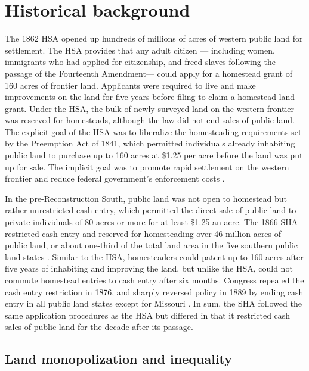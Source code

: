 \documentclass[12pt]{article}
\begin{document}
\setcounter{section}{1} %
\section{Historical background} \label{history}

The 1862 HSA opened up hundreds of millions of acres of western public land for settlement. The HSA provides that any adult citizen --- including women, immigrants who had applied for citizenship, and freed slaves following the passage of the Fourteenth Amendment---  could apply for a homestead grant of 160 acres of frontier land. Applicants were required to live and make improvements on the land for five years before filing to claim a homestead land grant. Under the HSA, the bulk of newly surveyed land on the western frontier was reserved for homesteads, although the law did not end sales of public land. The explicit goal of the HSA was to liberalize the homesteading requirements set by the Preemption Act of 1841, which permitted individuals already inhabiting public land to purchase up to 160 acres at \$1.25 per acre before the land was put up for sale. The implicit goal was to promote rapid settlement on the western frontier and reduce federal government's enforcement costs \citep{allen1991homesteading}.

In the pre-Reconstruction South, public land was not open to homestead but rather unrestricted cash entry, which permitted the direct sale of public land to private individuals of 80 acres or more for at least \$1.25 an acre. The 1866 SHA restricted cash entry and reserved for homesteading over 46 million acres of public land, or about one-third of the total land area in the five southern public land states \citep[pp. 13]{lanza1999agrarianism}. Similar to the HSA, homesteaders could patent up to 160 acres after five years of inhabiting and improving the land, but unlike the HSA, could not commute homestead entries to cash entry after six months. Congress repealed the cash entry restriction in 1876, and sharply reversed policy in 1889 by ending cash entry in all public land states except for Missouri \citep{gates1940federal}. In sum, the SHA followed the same application procedures as the HSA but differed in that it restricted cash sales of public land for the decade after its passage. 


\subsection{Land monopolization and inequality} 
\end{document}
